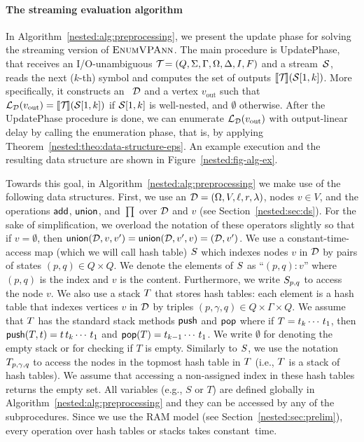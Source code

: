\paragraph{The streaming evaluation algorithm} In Algorithm~\ref{nested:alg:preprocessing}, we present the update phase for solving the streaming version of $\textsc{EnumVPAnn}$. The main procedure is {\sc UpdatePhase}, that receives an I/O-unambiguous \vpann $\mathcal{T}\! = (Q, \Sigma, \Gamma, \Omega, \Delta, I, F)$ and a stream~$\mathcal{S}$, reads the next ($k$-th) symbol and computes the set of outputs $\llbracket \mathcal{T}\! \rrbracket(\mathcal{S}[1,k])$.
More specifically, it constructs an \dsepsabbr~$\mathcal{D}$ and a vertex $v_{\text{out}}$ such that $\mathcal{L}_{\mathcal{D}}(v_{\text{out}}) = {\llbracket{\mathcal{T}\!}\rrbracket}(\mathcal{S}[1,k])$ if $\mathcal{S}[1,k]$ is well-nested, and $\emptyset$ otherwise.
After the {\sc UpdatePhase} procedure is done, we can enumerate $\mathcal{L}_{\mathcal{D}}(v_{\text{out}})$ with output-linear delay by calling the enumeration phase, that is, by applying Theorem~\ref{nested:theo:data-structure-eps}. An example execution and the resulting data structure are shown in Figure~\ref{nested:fig-alg-ex}.

Towards this goal, in Algorithm~\ref{nested:alg:preprocessing} we make use of the following data structures. First, we use an \dsepsabbr $\mathcal{D} = (\Omega, V, \ell, r, \lambda)$, nodes $v \in V$, and the operations $\mathsf{add}$, $\mathsf{union}$, and $\prod$ over $\mathcal{D}$ and $v$ (see Section~\ref{nested:sec:ds}). For the sake of simplification, we overload the notation of these operators slightly so that if $v = \emptyset$, then $\mathsf{union}(\mathcal{D},v,v') = \mathsf{union}(\mathcal{D},v',v) = (\mathcal{D},v')$. 
We use a constant-time-access map (which we will call hash table) $S$ which indexes nodes $v$ in $\mathcal{D}$ by pairs of states $(p,q) \in Q\times Q$. We denote the elements of $S$ as ``$(p,q) : v$'' where $(p,q)$ is the index and $v$ is the content. Furthermore, we write $S_{p,q}$ to access the node $v$. We also use a stack $T$ that stores hash tables: each element is a hash table that indexes vertices $v$ in $\mathcal{D}$ by triples $(p, \gamma, q) \in Q \times \Gamma \times Q$. 
We assume that $T$ has the standard stack methods $\mathsf{push}$ and $\mathsf{pop}$ where if $T = t_k\cdots\,t_1$, then $\mathsf{push}(T,t) = t\, t_k\cdots\,t_1$ and $\mathsf{pop}(T) = t_{k-1}\cdots\,t_1$. We write $\emptyset$ for denoting the empty stack or for checking if $T$ is empty.
Similarly to $S$, we use the notation $T_{p,\gamma,q}$ to access the nodes in the topmost hash table in $T$ (i.e., $T$ is a stack of hash tables). 
We assume that accessing a non-assigned index in these hash tables returns the empty set.
All variables (e.g., $S$ or $T$) are defined globally in Algorithm~\ref{nested:alg:preprocessing} and they can be accessed by any of the subprocedures. 
Since we use the RAM model (see Section~\ref{nested:sec:prelim}), every operation over hash tables or stacks takes constant~time. 

